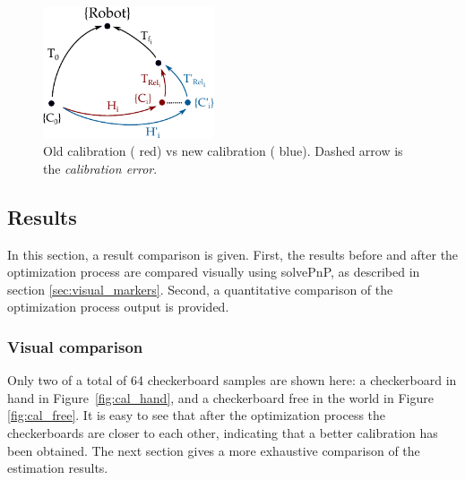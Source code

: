 \begin{figure}[!htbp]
 \centering
 \includegraphics[width=0.45\textwidth]{images/update02.pdf}
 \caption{Old calibration ({\color{red} red}) vs new calibration ({\color{blue} blue}). Dashed arrow is the \textit{calibration error}.}
 \label{fig:update02}
\end{figure}


\subsection{Results}
\label{sec:results}

In this section, a result comparison is given. First, the results before and after the optimization process are compared visually using solvePnP, as described in section \ref{sec:visual_markers}. Second, a quantitative comparison of the optimization process output is provided.

\subsubsection{Visual comparison}

Only two of a total of 64 checkerboard samples are shown here: a checkerboard in hand in Figure~\ref{fig:cal_hand}, and a checkerboard free in the world in Figure \ref{fig:cal_free}. It is easy to see that after the optimization process the checkerboards are closer to each other, indicating that a better calibration has been obtained. The next section gives a more exhaustive comparison of the estimation results.
%

